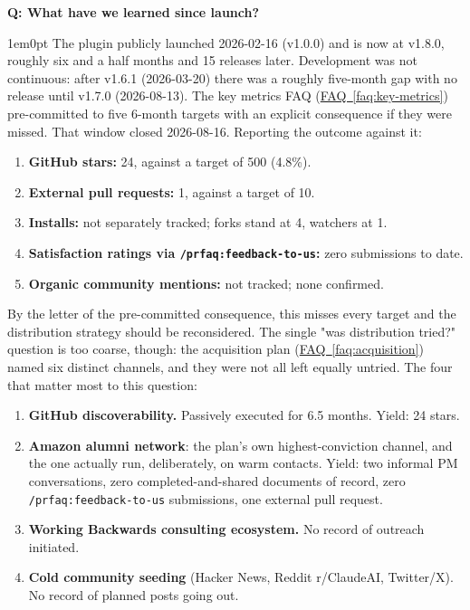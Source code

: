\documentclass[11pt,letterpaper]{article}
\newcounter{faqnum}
\newenvironment{faqpair}[1]{%
  \needspace{4\baselineskip}%
  \vspace{0.5em}%
  \refstepcounter{faqnum}%
  \noindent\textbf{\color{SectionBlue}Q\thefaqnum: #1}\par\nopagebreak[4]%
  \vspace{0.2em}%
  \begin{adjustwidth}{1em}{0pt}%
  \setlength{\parindent}{0pt}%
}{%
  \end{adjustwidth}%
  \vspace{0.5em}%
}
\newcommand{\faqref}[1]{\hyperref[#1]{FAQ~\ref*{#1}}}
\begin{document}
\begin{faqpair}{What have we learned since launch?}\label{faq:learned}
  The plugin publicly launched 2026-02-16 (v1.0.0) and is now at v1.8.0, roughly six and a half months and 15 releases later. Development was not continuous: after v1.6.1 (2026-03-20) there was a roughly five-month gap with no release until v1.7.0 (2026-08-13). The key metrics FAQ (\faqref{faq:key-metrics}) pre-committed to five 6-month targets with an explicit consequence if they were missed. That window closed 2026-08-16. Reporting the outcome against it:

  \begin{enumerate}[nosep]
    \item \textbf{GitHub stars:} 24, against a target of 500 (4.8\%).
    \item \textbf{External pull requests:} 1, against a target of 10.
    \item \textbf{Installs:} not separately tracked; forks stand at 4, watchers at 1.
    \item \textbf{Satisfaction ratings via \texttt{/prfaq:feedback-to-us}:} zero submissions to date.
    \item \textbf{Organic community mentions:} not tracked; none confirmed.
  \end{enumerate}

  By the letter of the pre-committed consequence, this misses every target and the distribution strategy should be reconsidered. The single "was distribution tried?" question is too coarse, though: the acquisition plan (\faqref{faq:acquisition}) named six distinct channels, and they were not all left equally untried. The four that matter most to this question:

  \begin{enumerate}[nosep]
    \item[(1)] \textbf{GitHub discoverability.} Passively executed for 6.5 months. Yield: 24 stars.
    \item[(2)] \textbf{Amazon alumni network}: the plan's own highest-conviction channel, and the one actually run, deliberately, on warm contacts. Yield: two informal PM conversations, zero completed-and-shared documents of record, zero \texttt{/prfaq:feedback-to-us} submissions, one external pull request.
    \item[(3)] \textbf{Working Backwards consulting ecosystem.} No record of outreach initiated.
    \item[(4)] \textbf{Cold community seeding} (Hacker News, Reddit r/ClaudeAI, Twitter/X). No record of planned posts going out.
  \end{enumerate}


\end{faqpair}
\end{document}
